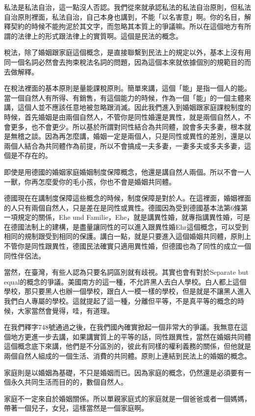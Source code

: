 \documentclass[oneside,sub3section]{ctexbook}
\begin{document}
私法是私法自治，這一點沒人否認。我們從來就承認私法的私法自治原則，但私法自治原則裡面，私法自治，自己本身也講到，不能「以名害意」啊。你的名目，解釋契約的時候不能拘泥於其文字，而忽略其本質上的爭議嘛。所以在這個地方有所謂的法律上的形式跟法律上的實質啊。這個是民法的概念。

稅法，除了婚姻跟家庭這個概念，是直接聯繫到民法上的規定以外，基本上沒有用同一個名詞必然會去拘束稅法名詞的問題，因為這個本來就依據個別的規範目的而去做解釋。

在稅法裡面的基本原則是量能課稅原則。簡單來講，這個「能」是指一個人的能。當一個自然人有所得、有銷售，有這個能力的時候，作為一個「能」的一個主體來講，這個人並不應該任意地被忽略跟消滅。因此我們進入到婚姻跟家庭課稅制度的時候，首先婚姻是由兩個自然人，不管你是同性婚還是異性，就是兩個自然人，不會更多，也不會更少。所以基於所謂對同性結合為共同體，說會多夫多妻，根本就是無稽之談。因為再怎麼講，婚姻一定是兩個人，只是同性或異性的差別，還是以兩個人結合為共同體作為前提，所以不會搞成一夫多妻，一妻多夫或多夫多妻，這個是不存在的。

即使是用德國的婚姻家庭婚姻制度保障概念，他還是講自然人兩個。所以不會一人一獸，你再怎麼愛你的毛小孩，你也不會是婚姻共同體。

德國現在在講制度保障這些概念的時候，制度保障是對於人。在這裡面，婚姻裡面的人只有兩個自然人，只是差在是同性或異性。德國因為受到德國基本法第6條第一項規定的關係，Ehe und Familie，Ehe，就是講異性婚，就專指講異性婚，可是在德國法制上的建構，是盡量讓同性的可以進入跟異性婚Ehr這個概念，可以受到相同的規制跟受到相同的保護。講白一點，就是只要進入這個婚姻共同體，原則上不管你是同性跟異性，德國民法確實只適用異性婚，但德國也為了同性的成立一個同性伴侶法。

當然，在臺灣，有些人認為只要名詞區別就有歧視。其實也會有對於Separate but equal的概念的爭議。美國南方的這一種，不允許黑人去白人學校。白人都上這個學校，那只要黑人也辦一個學校，跟白人一模一樣的學校，但是就是不讓黑人進入我們白人專屬的學校。這就提起了這一種，分離但平等，不是真平等的概念的時候，大家當然會覺得，哇，有道理。

在我們釋字748號通過之後，在我們國內確實掀起一個非常大的爭議。我無意在這個地方更進一步去講，如果講實質上的平等的話，同性跟異性，當然在婚姻共同體這個概念底下來講，他們是不分區別的，彼此有同樣的權利義務的關係，但他就是兩個自然人組成的一個生活、消費的共同體。原則上連結到民法上的婚姻的概念。

家庭則是以婚姻為基礎，不只是婚姻而已。因為家庭的概念，仍然還是必須要有一個永久共同生活而目的的，數個自然人。

家庭不一定來自於婚姻關係。所以單親家庭式的家庭就是一個爸爸或者一個媽媽，帶著一個兒子，女兒，這樣當然是一個家庭啊。
\end{document}

